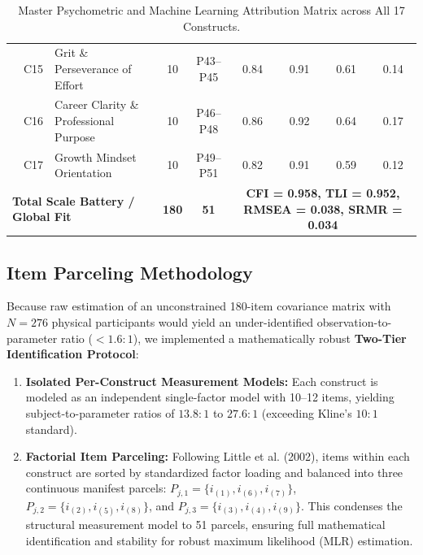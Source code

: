 \documentclass[10pt,a4paper]{article}
\begin{document}
\begin{table}[h!]
\begin{tabularx}{\textwidth}{cc>{\raggedright\arraybackslash}Xcccccc}
\rowcolor{GoldBG} & C15 & Grit \& Perseverance of Effort & 10 & P43--P45 & 0.84 & 0.91 & 0.61 & 0.14 \\
\rowcolor{GoldBG} \multirow{-4}{*}{\textbf{Q4}} & C16 & Career Clarity \& Professional Purpose & 10 & P46--P48 & 0.86 & 0.92 & 0.64 & 0.17 \\
\rowcolor{GoldBG} & C17 & Growth Mindset Orientation & 10 & P49--P51 & 0.82 & 0.91 & 0.59 & 0.12 \\
\midrule
\multicolumn{3}{l}{\textbf{Total Scale Battery / Global Fit}} & \textbf{180} & \textbf{51} & \multicolumn{4}{c}{\textbf{CFI = 0.958, TLI = 0.952, RMSEA = 0.038, SRMR = 0.034}} \\
\bottomrule
\end{tabularx}
\caption{Master Psychometric and Machine Learning Attribution Matrix across All 17 Constructs.}
\end{table}

\subsection{Item Parceling Methodology}
Because raw estimation of an unconstrained 180-item covariance matrix with $N = 276$ physical participants would yield an under-identified observation-to-parameter ratio ($< 1.6:1$), we implemented a mathematically robust \textbf{Two-Tier Identification Protocol}:
\begin{enumerate}[noitemsep, topsep=2pt]
  \item \textbf{Isolated Per-Construct Measurement Models:} Each construct is modeled as an independent single-factor model with 10--12 items, yielding subject-to-parameter ratios of $13.8:1$ to $27.6:1$ (exceeding Kline's $10:1$ standard).
  \item \textbf{Factorial Item Parceling:} Following Little et al. (2002), items within each construct are sorted by standardized factor loading and balanced into three continuous manifest parcels:
  $P_{j,1} = \{i_{(1)}, i_{(6)}, i_{(7)}\}$, $P_{j,2} = \{i_{(2)}, i_{(5)}, i_{(8)}\}$, and $P_{j,3} = \{i_{(3)}, i_{(4)}, i_{(9)}\}$.
  This condenses the structural measurement model to 51 parcels, ensuring full mathematical identification and stability for robust maximum likelihood (MLR) estimation.
\end{enumerate}

\newpage
\end{document}
